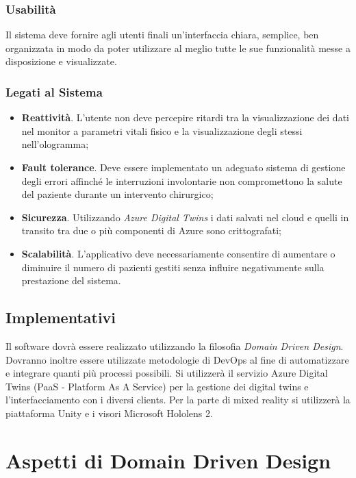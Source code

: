 \subsubsection{Usabilità}
Il sistema deve fornire agli utenti finali un’interfaccia chiara, semplice, ben organizzata in modo da poter utilizzare al meglio tutte le sue funzionalità messe a disposizione e visualizzate.

\subsubsection{Legati al Sistema}
\begin{itemize}
    \item \textbf{Reattività}. L'utente non deve percepire ritardi tra la visualizzazione dei dati nel monitor a parametri vitali fisico e la visualizzazione degli stessi nell'ologramma;
    
    \item \textbf{Fault tolerance}. Deve essere implementato un adeguato sistema di gestione degli errori affinché le interruzioni involontarie non compromettono la salute del paziente durante un intervento chirurgico;
    
    \item \textbf{Sicurezza}. Utilizzando \textit{Azure Digital Twins} i dati salvati nel cloud e quelli in transito tra due o più componenti di Azure sono crittografati;
    
    \item \textbf{Scalabilità}. L’applicativo deve necessariamente consentire di aumentare o diminuire il numero di pazienti gestiti senza influire negativamente sulla prestazione del sistema. 
\end{itemize}

\subsection{Implementativi}
Il software dovrà essere realizzato utilizzando la filosofia \textit{Domain Driven Design}. Dovranno inoltre essere utilizzate metodologie di DevOps al fine di automatizzare e integrare quanti più processi possibili. Si utilizzerà il servizio Azure Digital Twins (PaaS - Platform As A Service) per la gestione dei digital twins e l'interfacciamento con i diversi clients. Per la parte di mixed reality si utilizzerà la piattaforma Unity e i visori Microsoft Hololens 2.

\section{Aspetti di Domain Driven Design}

